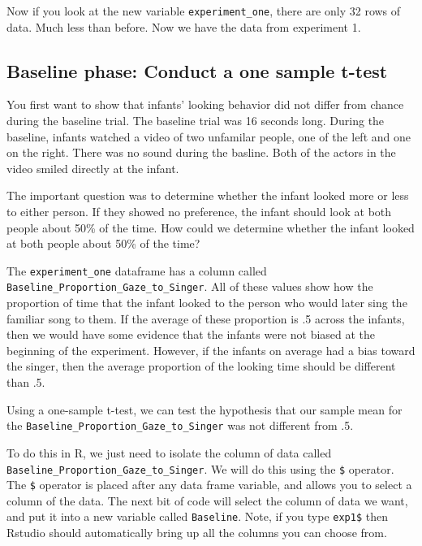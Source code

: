 \documentclass[]{book}
\newenvironment{Shaded}{\begin{snugshade}}{\end{snugshade}}
\newcommand{\KeywordTok}[1]{\textcolor[rgb]{0.13,0.29,0.53}{\textbf{{#1}}}}
\newcommand{\DecValTok}[1]{\textcolor[rgb]{0.00,0.00,0.81}{{#1}}}
\newcommand{\StringTok}[1]{\textcolor[rgb]{0.31,0.60,0.02}{{#1}}}
\newcommand{\NormalTok}[1]{{#1}}
\theoremstyle{definition}
\theoremstyle{definition}
\theoremstyle{definition}
\theoremstyle{remark}
\begin{document}
\begin{Shaded}
\end{Shaded}

Now if you look at the new variable \texttt{experiment\_one}, there are
only 32 rows of data. Much less than before. Now we have the data from
experiment 1.

\subsection{Baseline phase: Conduct a one sample
t-test}\label{baseline-phase-conduct-a-one-sample-t-test}

You first want to show that infants' looking behavior did not differ
from chance during the baseline trial. The baseline trial was 16 seconds
long. During the baseline, infants watched a video of two unfamilar
people, one of the left and one on the right. There was no sound during
the basline. Both of the actors in the video smiled directly at the
infant.

The important question was to determine whether the infant looked more
or less to either person. If they showed no preference, the infant
should look at both people about 50\% of the time. How could we
determine whether the infant looked at both people about 50\% of the
time?

The \texttt{experiment\_one} dataframe has a column called
\texttt{Baseline\_Proportion\_Gaze\_to\_Singer}. All of these values
show how the proportion of time that the infant looked to the person who
would later sing the familiar song to them. If the average of these
proportion is .5 across the infants, then we would have some evidence
that the infants were not biased at the beginning of the experiment.
However, if the infants on average had a bias toward the singer, then
the average proportion of the looking time should be different than .5.

Using a one-sample t-test, we can test the hypothesis that our sample
mean for the \texttt{Baseline\_Proportion\_Gaze\_to\_Singer} was not
different from .5.

To do this in R, we just need to isolate the column of data called
\texttt{Baseline\_Proportion\_Gaze\_to\_Singer}. We will do this using
the \texttt{\$} operator. The \texttt{\$} operator is placed after any
data frame variable, and allows you to select a column of the data. The
next bit of code will select the column of data we want, and put it into
a new variable called \texttt{Baseline}. Note, if you type
\texttt{exp1\$} then Rstudio should automatically bring up all the
columns you can choose from.
\end{document}
